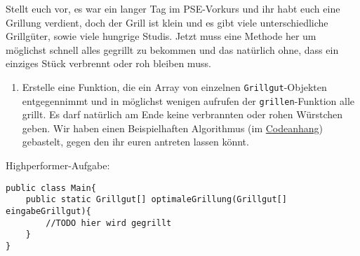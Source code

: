 \documentclass{../../sheet}
\begin{document}
\newpage
{}
Stellt euch vor, es war ein langer Tag im PSE-Vorkurs und ihr habt euch eine Grillung verdient, doch der Grill ist klein und es gibt viele unterschiedliche Grillgüter, sowie viele hungrige Studis. Jetzt muss eine Methode her um möglichst schnell alles gegrillt zu bekommen und das natürlich ohne, dass ein einziges Stück verbrennt oder roh bleiben muss.
\begin{enumerate}
    \item Erstelle eine Funktion, die ein Array von einzelnen \texttt{Grillgut}-Objekten entgegennimmt und in möglichst wenigen aufrufen der \texttt{grillen}-Funktion alle grillt. Es darf natürlich am Ende keine verbrannten oder rohen Würstchen geben. Wir haben einen Beispielhaften Algorithmus (im \hyperlink{Highperformer}{Codeanhang}) gebastelt, gegen den ihr euren antreten lassen könnt. 
\end{enumerate}

\newpage
{}
Highperformer-Aufgabe:
\hypertarget{Highperformer}{}
\begin{verbatim}
public class Main{
    public static Grillgut[] optimaleGrillung(Grillgut[] eingabeGrillgut){
        //TODO hier wird gegrillt
    }
}
\end{verbatim}
\end{document}
